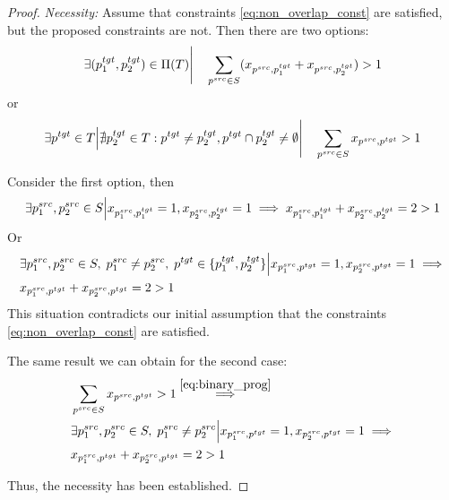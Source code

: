 \begin{proof}
  \textit{Necessity:} Assume that constraints \eqref{eq:non_overlap_const} are satisfied, but
  the proposed constraints are not. Then there are two options:
  \[
    \exists (p_1^{tgt}, p_2^{tgt}) \in \Pi(T) \Bigg| \quad
    \sum\limits_{p^{src} \in S} (x_{p^{src}, p_1^{tgt}} + x_{p^{src}, p_2^{tgt}}) > 1
  \]
  or
  \[
    \exists p^{tgt} \in T \Big|
    \nexists p_2^{tgt} \in T: p^{tgt} \neq p_2^{tgt}, p^{tgt} \cap p_2^{tgt} \neq \emptyset
    \Bigg| \quad \sum\limits_{p^{src} \in S} x_{p^{src}, p^{tgt}} > 1
  \]

  Consider the first option, then
  \begin{align*}
    \exists p_1^{src}, p_2^{src} \in S \Big| x_{p_1^{src}, p_1^{tgt}} = 1, x_{p_2^{src}, p_2^{tgt}} = 1 \implies
    x_{p_1^{src}, p_1^{tgt}} + x_{p_2^{src}, p_2^{tgt}} = 2 > 1 \\
  \end{align*}
  Or
  \begin{align*}
    & \exists p_1^{src}, p_2^{src} \in S, \; p_1^{src} \neq p_2^{src}, \; p^{tgt} \in \{p_1^{tgt}, p_2^{tgt}  \} \Big| x_{p_1^{src}, p^{tgt}} = 1, x_{p_2^{src}, p^{tgt}} = 1 \implies \\
    & x_{p_1^{src}, p^{tgt}} + x_{p_2^{src}, p^{tgt}} = 2 > 1
  \end{align*}
  This situation contradicts our initial assumption that the constraints \eqref{eq:non_overlap_const} are satisfied.

  The same result we can obtain for the second case:
  \begin{align*}
    & \sum\limits_{p^{src} \in S} x_{p^{src}, p^{tgt}} > 1
    \stackrel{\eqref{eq:binary_prog}}{\implies}                                                                                           \\
    & \exists p_1^{src}, p_2^{src} \in S, \; p_1^{src} \neq p_2^{src} \Big| x_{p_1^{src}, p^{tgt}} = 1, x_{p_2^{src}, p^{tgt}} = 1 \implies \\
    & x_{p_1^{src}, p^{tgt}} + x_{p_2^{src}, p^{tgt}} = 2 > 1
  \end{align*}

  Thus, the necessity has been established.


\end{proof}
